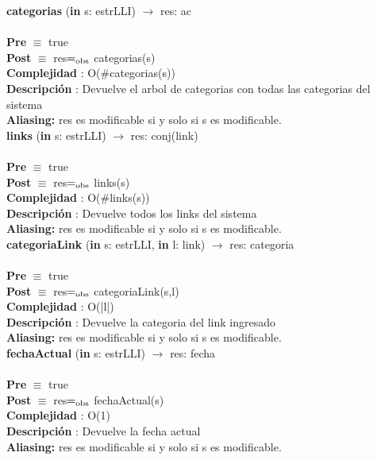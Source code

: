 	\textbf{categorias} (\textbf{in} s: estrLLI) $\longrightarrow$ res: ac\\\\
	\textbf{Pre} $\equiv$ {true}\\
	\textbf{Post} $\equiv$ {res$=_{\mathrm{obs}}$ categorias(s)}\\
	\textbf{Complejidad} : O($\#$categorias(s))\\
	\textbf{Descripci\'{o}n} : Devuelve el arbol de categorias con todas las categorias del sistema\\
	\textbf{Aliasing: }{res es modificable si y solo si s es modificable.} \\


	\textbf{links} (\textbf{in} s: estrLLI) $\longrightarrow$ res: conj(link)\\\\
	\textbf{Pre} $\equiv$ {true}\\
	\textbf{Post} $\equiv$ {res$=_{\mathrm{obs}}$ links(s)}\\
	\textbf{Complejidad} : O($\#$links(s))\\
	\textbf{Descripci\'{o}n} : Devuelve todos los links del sistema\\
	\textbf{Aliasing: }{res es modificable si y solo si s es modificable.} \\
	
	\textbf{categoriaLink} (\textbf{in} s: estrLLI, \textbf{in} l: link) $\longrightarrow$ res: categoria\\\\
	\textbf{Pre} $\equiv$ {true}\\
	\textbf{Post} $\equiv$ {res$=_{\mathrm{obs}}$ categoriaLink(s,l)}\\
	\textbf{Complejidad} : O(|l|)\\
	\textbf{Descripci\'{o}n} : Devuelve la categoria del link ingresado\\
	\textbf{Aliasing: }{res es modificable si y solo si s es modificable.} \\

	\textbf{fechaActual} (\textbf{in} s: estrLLI) $\longrightarrow$ res: fecha\\\\
	\textbf{Pre} $\equiv$ {true}\\
	\textbf{Post} $\equiv$ {res$=_{\mathrm{obs}}$ fechaActual(s)}\\
	\textbf{Complejidad} : O(1)\\
	\textbf{Descripci\'{o}n} : Devuelve la fecha actual\\
	\textbf{Aliasing: }{res es modificable si y solo si s es modificable.}\\
	
